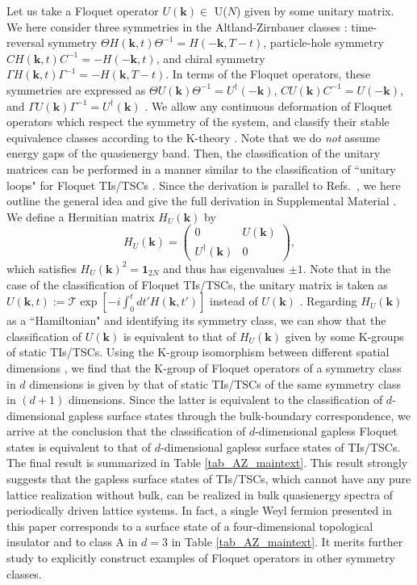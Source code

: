 \documentclass[
floatfix,
pra,
twocolumn,
reprint,
amsmath,amssymb,
aps,
footnote,
]{revtex4}
\begin{document}
Let us take a Floquet operator $U(\bm{k})\in$ U($N$) given by some unitary matrix. We here consider three symmetries in the Altland-Zirnbauer classes \cite{Kitaev09, Schnyder08}: time-reversal symmetry $\Theta H(\bm{k},t)\Theta^{-1}=H(-\bm{k},T-t)$, particle-hole symmetry $CH(\bm{k},t)C^{-1}=-H(-\bm{k},t)$, and chiral symmetry $\Gamma H(\bm{k},t)\Gamma^{-1}=-H(\bm{k},T-t)$. In terms of the Floquet operators, these symmetries are expressed as $\Theta U(\bm{k})\Theta^{-1}=U^\dag(-\bm{k})$, $CU(\bm{k})C^{-1}=U(-\bm{k})$, and $\Gamma U(\bm{k})\Gamma^{-1}=U^\dag(\bm{k})$ \cite{Kitagawa10}.
We allow any continuous deformation of Floquet operators which respect the symmetry of the system, and classify their stable equivalence classes according to the K-theory \cite{Kitaev09, TeoKane10}. Note that we do \textit{not} assume energy gaps of the quasienergy band.
Then, the classification of the unitary matrices can be performed in a manner similar to the classification of ``unitary loops" for Floquet TIs/TSCs \cite{RoyHarper17, MorimotoPoVishwanath17}.
Since the derivation is parallel to Refs.~\cite{RoyHarper17, MorimotoPoVishwanath17}, we here outline the general idea and give the full derivation in Supplemental Material \cite{derivation_classification}.
We define a Hermitian matrix $H_U(\bm{k})$ by
\begin{equation}
H_U(\bm{k})=
\begin{pmatrix}
0 & U(\bm{k})\\
U^\dag(\bm{k}) & 0
\end{pmatrix},
\label{eq_HU}
\end{equation}
which satisfies $H_U(\bm{k})^2=\bm{1}_{2N}$ and thus has eigenvalues $\pm 1$.
Note that in the case of the classification of Floquet TIs/TSCs, the unitary matrix is taken as $U(\bm{k},t):=\mathcal{T}\exp[-i\int_0^tdt'H(\bm{k},t')]$ instead of $U(\bm{k})$ \cite{RoyHarper17}. Regarding $H_U(\bm{k})$ as a ``Hamiltonian" and identifying its symmetry class,
we can show that the classification of $U(\bm{k})$ is equivalent to that of $H_U(\bm{k})$ given by some K-groups of static TIs/TSCs.
Using the K-group isomorphism between different spatial dimensions \cite{Kitaev09, TeoKane10},
we find that the K-group of Floquet operators of a symmetry class in $d$ dimensions is given by that of static TIs/TSCs of the same symmetry class in $(d+1)$ dimensions.
Since the latter is equivalent to the classification of $d$-dimensional gapless surface states through the bulk-boundary correspondence, we arrive at the conclusion that the classification of $d$-dimensional gapless Floquet states is equivalent to that of $d$-dimensional gapless surface states of TIs/TSCs.
The final result is summarized in Table \ref{tab_AZ_maintext}.
This result strongly suggests that the gapless surface states of TIs/TSCs, which cannot have any pure lattice realization without bulk, can be realized in bulk quasienergy spectra of periodically driven lattice systems.
In fact, a single Weyl fermion presented in this paper corresponds to a surface state of a four-dimensional topological insulator \cite{Qi08} and to class A in $d=3$ in Table \ref{tab_AZ_maintext}.
It merits further study to explicitly construct examples of Floquet operators in other symmetry classes.
\end{document}

